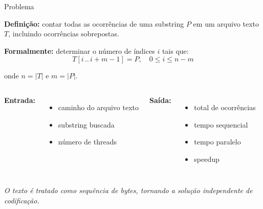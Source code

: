 \documentclass{beamer}
\begin{document}
\begin{frame}{Problema}

\textbf{Definição:} contar todas as ocorrências de uma substring $P$
em um arquivo texto $T$, incluindo ocorrências sobrepostas.

\vspace{0.3cm}

\textbf{Formalmente:} determinar o número de índices $i$ tais que:
\[
T[i\,..\,i+m-1] = P, \quad 0 \leq i \leq n-m
\]

onde $n = |T|$ e $m = |P|$.

\vspace{0.3cm}

\begin{columns}
    \textbf{Entrada:}
    \begin{itemize}
        \item caminho do arquivo texto
        \item substring buscada
        \item número de threads
    \end{itemize}

    \textbf{Saída:}
    \begin{itemize}
        \item total de ocorrências
        \item tempo sequencial
        \item tempo paralelo
        \item speedup
    \end{itemize}
\end{columns}

\vspace{0.3cm}

\small\textit{O texto é tratado como sequência de bytes,
tornando a solução independente de codificação.}

\end{frame}
\end{document}
